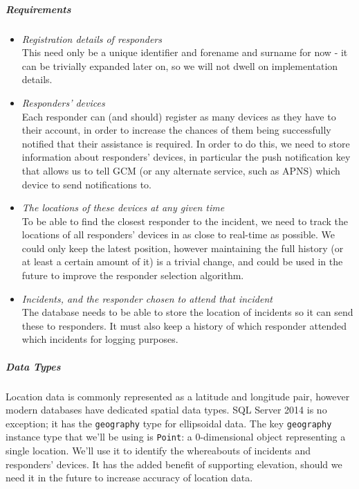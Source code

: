 \documentclass{article}
\begin{document}
	\subparagraph{Requirements}
	\begin{itemize}
	\item \textit{Registration details of responders}\\
This need only be a unique identifier and forename and surname for now - it can be trivially expanded later on, so we will not dwell on implementation details.
	\item \textit{Responders’ devices}\\Each responder can (and should) register as many devices as they have to their account, in order to increase the chances of them being successfully notified that their assistance is required. In order to do this, we need to store information about responders’ devices, in particular the push notification key that allows us to tell GCM (or any alternate service, such as APNS) which device to send notifications to.
	\item \textit{The locations of these devices at any given time}\\To be able to find the closest responder to the incident, we need to track the locations of all responders’ devices in as close to real-time as possible. We could only keep the latest position, however maintaining the full history (or at least a certain amount of it) is a trivial change, and could be used in the future to improve the responder selection algorithm.
	\item \textit{Incidents, and the responder chosen to attend that incident}\\The database needs to be able to store the location of incidents so it can send these to responders. It must also keep a history of which responder attended which incidents for logging purposes.
	\end{itemize}
	
	\subparagraph{Data Types}
	Location data is commonly represented as a latitude and longitude pair, however modern databases have dedicated spatial data types. SQL Server 2014 is no exception; it has the \texttt{\color{OliveGreen}geography} type for ellipsoidal data. The key \texttt{\color{OliveGreen}geography} instance type that we’ll be using is \texttt{\color{OliveGreen}Point}: a 0-dimensional object representing a single location. We’ll use it to identify the whereabouts of incidents and responders’ devices. It has the added benefit of supporting elevation, should we need it in the future to increase accuracy of location data.\\
	
\end{document}
